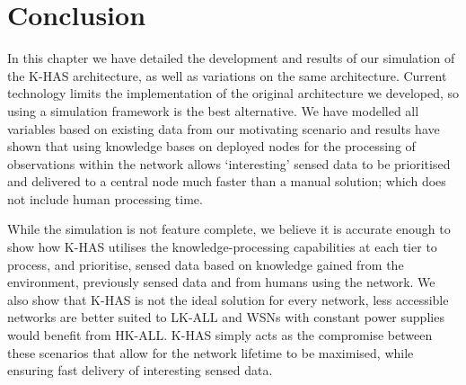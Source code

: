 \section{Conclusion}
	
In this chapter we have detailed the development and results of our simulation of the K-HAS architecture, as well as variations on the same architecture. Current technology limits the implementation of the original architecture we developed, so using a simulation framework is the best alternative. We have modelled all variables based on existing data from our motivating scenario and results have shown that using knowledge bases on deployed nodes for the processing of observations within the network allows `interesting' sensed data to be prioritised and delivered to a central node much faster than a manual solution; which does not include human processing time.

While the simulation is not feature complete, we believe it is accurate enough to show how K-HAS utilises the knowledge-processing capabilities at each tier to process, and prioritise, sensed data based on knowledge gained from the environment, previously sensed data and from humans using the network. We also show that K-HAS is not the ideal solution for every network, less accessible networks are better suited to LK-ALL and WSNs with constant power supplies would benefit from HK-ALL. K-HAS simply acts as the compromise between these scenarios that allow for the network lifetime to be maximised, while ensuring fast delivery of interesting sensed data.

